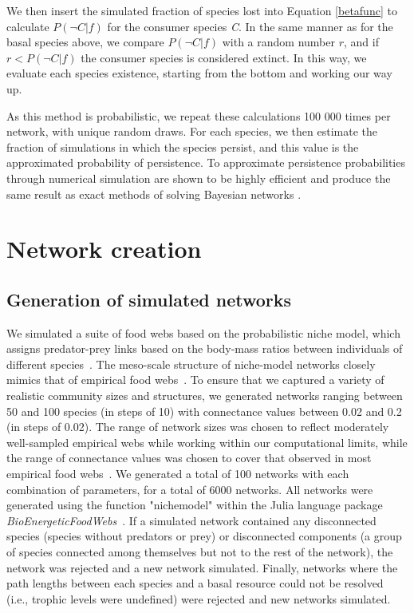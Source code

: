 \documentclass[12pt]{article}
\begin{document}
\begin{spacing}{2.0}
        
        We then insert the simulated fraction of species lost into Equation \ref{betafunc} to calculate $P(\lnot C|f)$ for the consumer species \textit{C}. 
        In the same manner as for the basal species above, we compare $P(\lnot C|f)$ with a random number $r$, and if $r < P(\lnot C|f)$ the consumer species is considered extinct. 
        In this way, we evaluate each species existence, starting from the bottom and working our way up.
        
        
        As this method is probabilistic, we repeat these calculations 100 000 times per network, with unique random draws.
        For each species, we then estimate the fraction of simulations in which the species persist, and this value is the approximated probability of persistence.
        To approximate persistence probabilities through numerical simulation are shown to be highly efficient and produce the same result as exact methods of solving Bayesian networks \citep{Haussler2020}.
        
        
\clearpage


\section{Network creation}

    \subsection*{Generation of simulated networks}

        We simulated a suite of food webs based on the probabilistic niche model, which assigns predator-prey links based on the body-mass ratios between individuals of different species~\citep{Williams2000,Delmas2017}. The meso-scale structure of niche-model networks closely mimics that of empirical food webs~\citep{Stouffer2007}. To ensure that we captured a variety of realistic community sizes and structures, we generated networks ranging between 50 and 100 species (in steps of 10) with connectance values between 0.02 and 0.2 (in steps of 0.02). The range of network sizes was chosen to reflect moderately well-sampled empirical webs while working within our computational limits, while the range of connectance values was chosen to cover that observed in most empirical food webs~\citep{Dunne2002e}. We generated a total of 100 networks with each combination of parameters, for a total of 6000 networks. All networks were generated using the function "nichemodel" within the Julia language package \emph{BioEnergeticFoodWebs}~\citep{bioenergeticfw,Delmas2017}. If a simulated network contained any disconnected species (species without predators or prey) or disconnected components (a group of species connected among themselves but not to the rest of the network), the network was rejected and a new network simulated. Finally, networks where the path lengths between each species and a basal resource could not be resolved (i.e., trophic levels were undefined) were rejected and new networks simulated.



\end{spacing}
\end{document}
